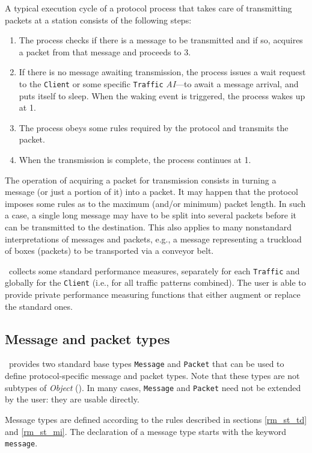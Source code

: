 A typical execution cycle of a protocol process that takes care of
transmitting packets at a station consists of the following steps:
\begin{enumerate}
\item
The process checks if there is a message to be transmitted and if so,
acquires a packet from that message and proceeds to 3.
\item
If there is no message awaiting transmission,
the process issues a wait request to the {\tt Client} or some
specific {\tt Traffic} {\em AI\/}---to await a message arrival, and puts
itself to sleep.
When the waking event is triggered, the process wakes up at 1.
\item
The process obeys some rules required by the protocol and transmits the packet.
\item
When the transmission is complete, the process continues at 1.
\end{enumerate}

The operation of acquiring a packet for transmission consists in turning
a message (or just a portion of it) into a packet.
It may happen that the protocol imposes some rules
as to the maximum (and/or minimum) packet length.
In such a case,
a single long message may have to be split into several packets before
it can be transmitted to the destination.
This also applies to many nonstandard interpretations of messages and
packets, e.g., a message representing a truckload of boxes (packets)
to be transported via a conveyor belt.

\smurph\ collects some standard performance measures, separately for each
{\tt Traffic} and globally for the {\tt Client} (i.e., for all
traffic patterns combined).
The user is able to provide private performance measuring functions that
either augment or replace the standard ones.

\subsection{Message and packet types}
\label{rm_cl_mp}

\smurph\ provides two standard base types {\tt Message} and {\tt Packet}
that can be used to define protocol-specific message and packet types.
Note that these types are not subtypes of {\em Object\/} ().
In many cases, {\tt Message} and {\tt Packet} need not be extended by
the user: they are usable directly.

Message types are defined according to the rules described in sections
\ref{rm_st_td} and \ref{rm_st_mi}.
The declaration of a message type starts with the keyword {\tt message}.

